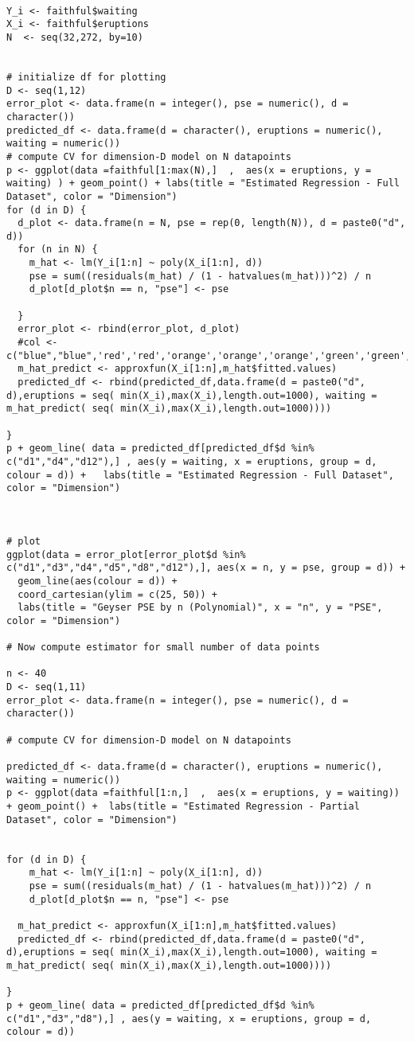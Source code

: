 
\begin{lstlisting}

Y_i <- faithful$waiting
X_i <- faithful$eruptions
N  <- seq(32,272, by=10)


# initialize df for plotting
D <- seq(1,12)
error_plot <- data.frame(n = integer(), pse = numeric(), d = character())
predicted_df <- data.frame(d = character(), eruptions = numeric(), waiting = numeric())
# compute CV for dimension-D model on N datapoints
p <- ggplot(data =faithful[1:max(N),]  ,  aes(x = eruptions, y = waiting) ) + geom_point() + labs(title = "Estimated Regression - Full Dataset", color = "Dimension") 
for (d in D) {
  d_plot <- data.frame(n = N, pse = rep(0, length(N)), d = paste0("d", d))
  for (n in N) {
    m_hat <- lm(Y_i[1:n] ~ poly(X_i[1:n], d))
    pse = sum((residuals(m_hat) / (1 - hatvalues(m_hat)))^2) / n
    d_plot[d_plot$n == n, "pse"] <- pse
    
  }
  error_plot <- rbind(error_plot, d_plot)
  #col <- c("blue","blue",'red','red','orange','orange','orange','green','green','green','green','green')
  m_hat_predict <- approxfun(X_i[1:n],m_hat$fitted.values)
  predicted_df <- rbind(predicted_df,data.frame(d = paste0("d", d),eruptions = seq( min(X_i),max(X_i),length.out=1000), waiting =  m_hat_predict( seq( min(X_i),max(X_i),length.out=1000))))
  
}
p + geom_line( data = predicted_df[predicted_df$d %in% c("d1","d4","d12"),] , aes(y = waiting, x = eruptions, group = d, colour = d)) +   labs(title = "Estimated Regression - Full Dataset", color = "Dimension")



# plot
ggplot(data = error_plot[error_plot$d %in% c("d1","d3","d4","d5","d8","d12"),], aes(x = n, y = pse, group = d)) + 
  geom_line(aes(colour = d)) +
  coord_cartesian(ylim = c(25, 50)) +
  labs(title = "Geyser PSE by n (Polynomial)", x = "n", y = "PSE", color = "Dimension")

# Now compute estimator for small number of data points

n <- 40
D <- seq(1,11)
error_plot <- data.frame(n = integer(), pse = numeric(), d = character())

# compute CV for dimension-D model on N datapoints

predicted_df <- data.frame(d = character(), eruptions = numeric(), waiting = numeric())
p <- ggplot(data =faithful[1:n,]  ,  aes(x = eruptions, y = waiting)) + geom_point() +  labs(title = "Estimated Regression - Partial Dataset", color = "Dimension")


for (d in D) {
    m_hat <- lm(Y_i[1:n] ~ poly(X_i[1:n], d))
    pse = sum((residuals(m_hat) / (1 - hatvalues(m_hat)))^2) / n
    d_plot[d_plot$n == n, "pse"] <- pse
    
  m_hat_predict <- approxfun(X_i[1:n],m_hat$fitted.values)
  predicted_df <- rbind(predicted_df,data.frame(d = paste0("d", d),eruptions = seq( min(X_i),max(X_i),length.out=1000), waiting =  m_hat_predict( seq( min(X_i),max(X_i),length.out=1000))))
  
}
p + geom_line( data = predicted_df[predicted_df$d %in% c("d1","d3","d8"),] , aes(y = waiting, x = eruptions, group = d, colour = d))


\end{lstlisting}
